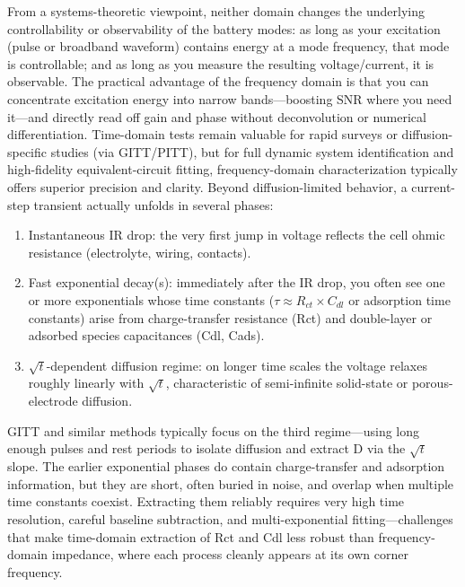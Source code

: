 From a systems-theoretic viewpoint, neither domain changes the underlying controllability or observability of the battery modes: as long as your excitation (pulse or broadband waveform) contains energy at a mode frequency, that mode is controllable; and as long as you measure the resulting voltage/current, it is observable. The practical advantage of the frequency domain is that you can concentrate excitation energy into narrow bands—boosting SNR where you need it—and directly read off gain and phase without deconvolution or numerical differentiation. Time-domain tests remain valuable for rapid surveys or diffusion-specific studies (via GITT/PITT), but for full dynamic system identification and high-fidelity equivalent-circuit fitting, frequency-domain characterization typically offers superior precision and clarity.
Beyond diffusion-limited behavior, a current-step transient actually unfolds in several phases:

\begin{enumerate}
\item Instantaneous IR drop: the very first jump in voltage reflects the cell ohmic resistance (electrolyte, wiring, contacts).
\item Fast exponential decay(s): immediately after the IR drop, you often see one or more exponentials whose time constants ($\tau \approx R_{ct} \times C_{dl} $ or adsorption time constants) arise from charge-transfer resistance (Rct) and double-layer or adsorbed species capacitances (Cdl, Cads).
\item $\sqrt{t}$-dependent diffusion regime: on longer time scales the voltage relaxes roughly linearly with $\sqrt{t}$, characteristic of semi-infinite solid-state or porous-electrode diffusion.
\end{enumerate}
GITT and similar methods typically focus on the third regime—using long enough pulses and rest periods to isolate diffusion and extract D via the $\sqrt{t}$ slope. The earlier exponential phases do contain charge-transfer and adsorption information, but they are short, often buried in noise, and overlap when multiple time constants coexist. Extracting them reliably requires very high time resolution, careful baseline subtraction, and multi-exponential fitting—challenges that make time-domain extraction of Rct and Cdl less robust than frequency-domain impedance, where each process cleanly appears at its own corner frequency.

